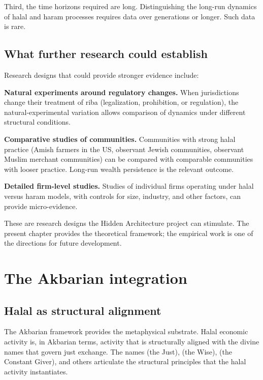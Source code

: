 Third, the time horizons required are long. Distinguishing the
long-run dynamics of halal and haram processes requires data over
generations or longer. Such data is rare.

\subsection{What further research could establish}

Research designs that could provide stronger evidence include:

\textbf{Natural experiments around regulatory changes.} When
jurisdictions change their treatment of riba (legalization,
prohibition, or regulation), the natural-experimental variation
allows comparison of dynamics under different structural conditions.

\textbf{Comparative studies of communities.} Communities with
strong halal practice (Amish farmers in the US, observant Jewish
communities, observant Muslim merchant communities) can be
compared with comparable communities with looser practice. Long-run
wealth persistence is the relevant outcome.

\textbf{Detailed firm-level studies.} Studies of individual firms
operating under halal versus haram models, with controls for size,
industry, and other factors, can provide micro-evidence.

These are research designs the Hidden Architecture project can
stimulate. The present chapter provides the theoretical framework;
the empirical work is one of the directions for future development.

\section{The Akbarian integration}
\label{sec:halal-akbarian}

\subsection{Halal as structural alignment}

The Akbarian framework provides the metaphysical substrate. Halal
economic activity is, in Akbarian terms, activity that is
structurally aligned with the divine names that govern just
exchange. The names  (the Just),  (the
Wise),  (the Constant Giver), and others articulate
the structural principles that the halal activity instantiates.

